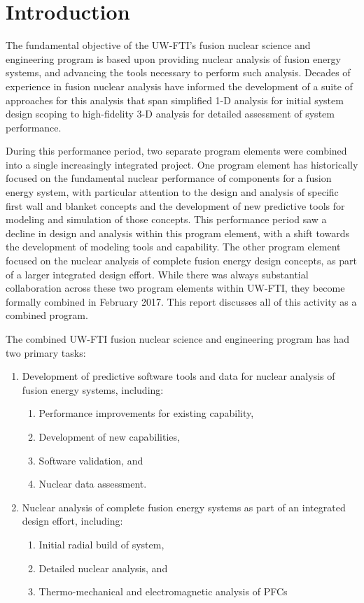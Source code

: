 \section{Introduction}

The fundamental objective of the \gls{UW-FTI}'s fusion nuclear science and
engineering program is based upon providing nuclear analysis of fusion energy
systems, and advancing the tools necessary to perform such analysis.  Decades
of experience in fusion nuclear analysis have informed the development of a
suite of approaches for this analysis that span simplified 1-D analysis for
initial system design scoping to high-fidelity 3-D analysis for detailed
assessment of system performance.

During this performance period, two separate program elements were combined
into a single increasingly integrated project.  One program element has
historically focused on the fundamental nuclear performance of components for
a fusion energy system, with particular attention to the design and analysis
of specific first wall and blanket concepts and the development of new
predictive tools for modeling and simulation of those concepts.  This
performance period saw a decline in design and analysis within this program
element, with a shift towards the development of modeling tools and
capability.  The other program element focused on the nuclear analysis of
complete fusion energy design concepts, as part of a larger integrated design
effort.  While there was always substantial collaboration across these two
program elements within \gls{UW-FTI}, they become formally combined in
February 2017.  This report discusses all of this activity as a combined
program.

The combined \gls{UW-FTI} fusion nuclear science and engineering program has
had two primary tasks:
\begin{enumerate}
\item Development of predictive software tools and data for nuclear analysis
  of fusion energy systems, including:
  \begin{enumerate}
  \item Performance improvements for existing capability,
  \item Development of new capabilities,
  \item Software validation, and
  \item Nuclear data assessment.
  \end{enumerate}
\item Nuclear analysis of complete fusion energy systems as part of an
  integrated design effort, including:
  \begin{enumerate}
  \item Initial radial build of system,
  \item Detailed nuclear analysis, and
  \item Thermo-mechanical and electromagnetic analysis of \glspl{PFC}
  \end{enumerate}
\end{enumerate}

